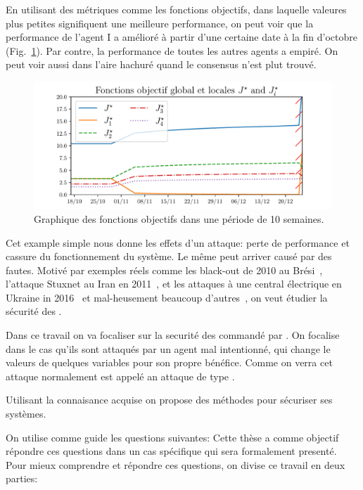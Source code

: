 \documentclass[../main.tex]{subfiles}
\begin{document}
En utilisant des métriques comme les fonctions objectifs, dans laquelle valeures plus petites signifiquent une meilleure performance, on peut voir que la performance de l'agent I a amélioré à partir d'une certaine date à la fin d'octobre (Fig.~\ref{fig:change_in_j_fr}).
Par contre, la performance de toutes les autres agents a empiré.
On peut voir aussi dans l'aire hachuré quand le consensus n'est plut trouvé.
\begin{figure}[h]
  \centering
  \includegraphics[width=.8\textwidth]{../img/example_introduction/example_J_fr.pdf}
  \caption{Graphique des fonctions objectifs dans une période de 10 semaines.}\label{fig:change_in_j_fr}
\end{figure}

Cet example simple nous donne les effets d'un attaque: perte de performance et cassure du fonctionnement du système.
Le même peut arriver causé par des fautes.
Motivé par exemples réels comme les black-out de 2010 au Brési~\cite{Conti2010}, l'attaque Stuxnet au Iran en 2011~\cite{Langner2011}, et les attaques à une central électrique en Ukraine in 2016~\cite{Bindra2017} et mal-heusement beaucoup d'autres~\cite{DingEtAl2018,DibajiEtAl2019}, on veut étudier la sécurité des \cps{}.

Dans ce travail on va focaliser sur la securité des \cps{} commandé par \dmpc{}.
On focalise dans le cas qu'ils sont attaqués par un agent mal intentionné, qui change le valeurs de quelques variables pour son propre bénéfice. Comme on verra cet attaque normalement est appelé an attaque de type \fdi{}.

Utilisant la connaisance acquise on propose des méthodes pour sécuriser ses systèmes.

On utilise comme guide les questions suivantes:
Cette thèse a comme objectif répondre ces questions dans un cas spécifique qui sera formalement presenté.
Pour mieux comprendre et répondre ces questions, on divise ce travail en deux parties:
\end{document}
